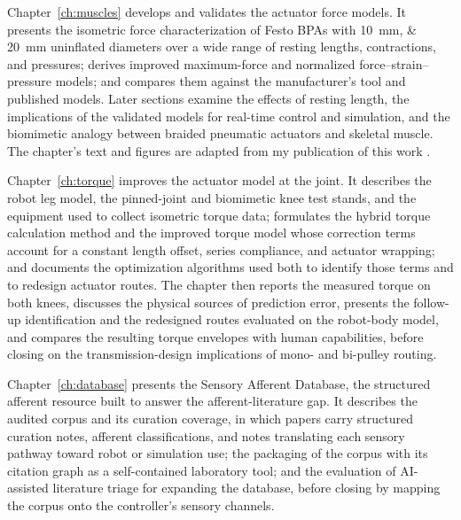 Chapter~\ref{ch:muscles} develops and validates the actuator force models. It presents the isometric force characterization of Festo BPAs with \qtylist{10;20}{\mm} uninflated diameters over a wide range of resting lengths, contractions, and pressures; derives improved maximum-force and normalized force--strain--pressure models; and compares them against the manufacturer's tool and published models. Later sections examine the effects of resting length, the implications of the validated models for real-time control and simulation, and the biomimetic analogy between braided pneumatic actuators and skeletal muscle. The chapter's text and figures are adapted from my publication of this work \citep{bolen_2026}.

Chapter~\ref{ch:torque} improves the actuator model at the joint. It describes the robot leg model, the pinned-joint and biomimetic knee test stands, and the equipment used to collect isometric torque data; formulates the hybrid torque calculation method and the improved torque model whose correction terms account for a constant length offset, series compliance, and actuator wrapping; and documents the optimization algorithms used both to identify those terms and to redesign actuator routes. The chapter then reports the measured torque on both knees, discusses the physical sources of prediction error, presents the follow-up identification and the redesigned routes evaluated on the robot-body model, and compares the resulting torque envelopes with human capabilities, before closing on the transmission-design implications of mono- and bi-pulley routing.

Chapter~\ref{ch:database} presents the Sensory Afferent Database, the structured afferent resource built to answer the afferent-literature gap. It describes the audited corpus and its curation coverage, in which papers carry structured curation notes, afferent classifications, and notes translating each sensory pathway toward robot or simulation use; the packaging of the corpus with its citation graph as a self-contained laboratory tool; and the evaluation of AI-assisted literature triage for expanding the database, before closing by mapping the corpus onto the controller's sensory channels.

